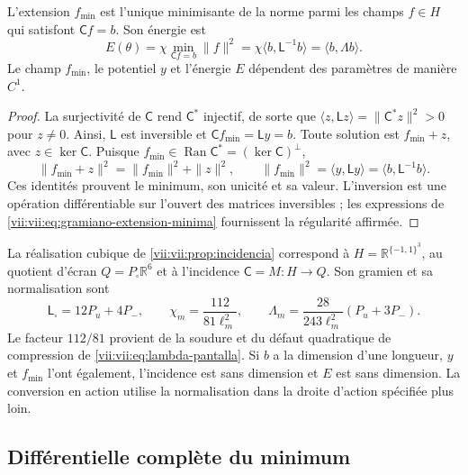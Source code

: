 \begin{proposition}
\label{vii:vii:prop:minimo-parametrizado}
L'extension \(f_{\min}\) est l'unique minimisante de la norme parmi
les champs \(f\in H\) qui satisfont \(\mathsf C f=b\). Son énergie est
\begin{equation}
 E(\theta)=\chi\min_{\mathsf C f=b}\|f\|^2
 =\chi\langle b,\mathsf L^{-1}b\rangle
 =\langle b,\Lambda b\rangle.
 \label{vii:vii:eq:energia-extension-minima}
\end{equation}
Le champ \(f_{\min}\), le potentiel \(y\) et l'énergie \(E\)
dépendent des paramètres de manière \(C^1\).
\end{proposition}

\begin{proof}
La surjectivité de \(\mathsf C\) rend \(\mathsf C^*\) injectif, de sorte que \(\langle z,\mathsf Lz\rangle=\|\mathsf C^*z\|^2>0\) pour \(z\ne0\). Ainsi, \(\mathsf L\) est inversible et \(\mathsf C f_{\min}=\mathsf L y=b\). Toute solution est \(f_{\min}+z\), avec \(z\in\ker\mathsf C\). Puisque \(f_{\min}\in\operatorname{Ran}\mathsf C^*=(\ker\mathsf C)^\perp\),
\[
 \|f_{\min}+z\|^2=\|f_{\min}\|^2+\|z\|^2,
 \qquad
 \|f_{\min}\|^2=\langle y,\mathsf L y\rangle
 =\langle b,\mathsf L^{-1}b\rangle.
\]
Ces identités prouvent le minimum, son unicité et sa valeur. L'inversion
est une opération différentiable sur l'ouvert des matrices inversibles ;
les expressions de \eqref{vii:vii:eq:gramiano-extension-minima} fournissent
la régularité affirmée.
\end{proof}

La réalisation cubique de \ref{vii:vii:prop:incidencia} correspond à
\(H=\mathbb R^{\{-1,1\}^3}\), au quotient d'écran
\(Q=P_\square\mathbb R^6\) et à l'incidence \(\mathsf C=M:H\to Q\).
Son gramien et sa normalisation sont
\begin{equation}
 \mathsf L_\square=12P_u+4P_-,\qquad
 \chi_m=\frac{112}{81\ell_m^2},\qquad
 \Lambda_m=\frac{28}{243\ell_m^2}(P_u+3P_-).
 \label{vii:vii:eq:normalizacion-minimo-cubico}
\end{equation}
Le facteur \(112/81\) provient de la soudure et du défaut quadratique de compression de \eqref{vii:vii:eq:lambda-pantalla}. Si \(b\) a la dimension d'une longueur, \(y\) et \(f_{\min}\) l'ont également, l'incidence est sans dimension et \(E\) est sans dimension. La conversion en action utilise la normalisation dans la droite d'action spécifiée plus loin.

\subsection{Différentielle complète du minimum}
\label{vii:vii:subsec:diferencial-minimo}

